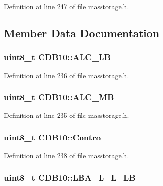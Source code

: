\-Definition at line 247 of file masstorage.\-h.



\subsection{\-Member \-Data \-Documentation}
\hypertarget{struct_c_d_b10_a5115777023c2a37ed50b81db126f648c}{
\subsubsection[{\-A\-L\-C\-\_\-\-L\-B}]{\setlength{\rightskip}{0pt plus 5cm}uint8\-\_\-t {\bf \-C\-D\-B10\-::\-A\-L\-C\-\_\-\-L\-B}}}\label{struct_c_d_b10_a5115777023c2a37ed50b81db126f648c}


\-Definition at line 236 of file masstorage.\-h.

\hypertarget{struct_c_d_b10_a31ae08f4bd0767c4fdb070c4c3f64212}{
\subsubsection[{\-A\-L\-C\-\_\-\-M\-B}]{\setlength{\rightskip}{0pt plus 5cm}uint8\-\_\-t {\bf \-C\-D\-B10\-::\-A\-L\-C\-\_\-\-M\-B}}}\label{struct_c_d_b10_a31ae08f4bd0767c4fdb070c4c3f64212}


\-Definition at line 235 of file masstorage.\-h.

\hypertarget{struct_c_d_b10_aa39a2ed8852448c4bcbba7d3bc478be5}{
\subsubsection[{\-Control}]{\setlength{\rightskip}{0pt plus 5cm}uint8\-\_\-t {\bf \-C\-D\-B10\-::\-Control}}}\label{struct_c_d_b10_aa39a2ed8852448c4bcbba7d3bc478be5}


\-Definition at line 238 of file masstorage.\-h.

\hypertarget{struct_c_d_b10_a87dd0f57fdaedb842f4c7db9b3f7cb2e}{
\subsubsection[{\-L\-B\-A\-\_\-\-L\-\_\-\-L\-\_\-\-L\-B}]{\setlength{\rightskip}{0pt plus 5cm}uint8\-\_\-t {\bf \-C\-D\-B10\-::\-L\-B\-A\-\_\-\-L\-\_\-\-L\-\_\-\-L\-B}}}\label{struct_c_d_b10_a87dd0f57fdaedb842f4c7db9b3f7cb2e}


